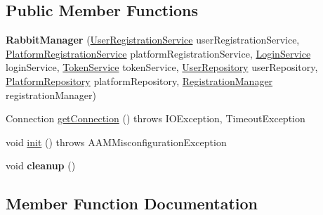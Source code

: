 \subsection*{Public Member Functions}
\begin{DoxyCompactItemize}
\item 
{\bfseries Rabbit\+Manager} (\hyperlink{classeu_1_1h2020_1_1symbiote_1_1security_1_1services_1_1UserRegistrationService}{User\+Registration\+Service} user\+Registration\+Service, \hyperlink{classeu_1_1h2020_1_1symbiote_1_1security_1_1services_1_1PlatformRegistrationService}{Platform\+Registration\+Service} platform\+Registration\+Service, \hyperlink{classeu_1_1h2020_1_1symbiote_1_1security_1_1services_1_1LoginService}{Login\+Service} login\+Service, \hyperlink{classeu_1_1h2020_1_1symbiote_1_1security_1_1services_1_1TokenService}{Token\+Service} token\+Service, \hyperlink{interfaceeu_1_1h2020_1_1symbiote_1_1security_1_1repositories_1_1UserRepository}{User\+Repository} user\+Repository, \hyperlink{interfaceeu_1_1h2020_1_1symbiote_1_1security_1_1repositories_1_1PlatformRepository}{Platform\+Repository} platform\+Repository, \hyperlink{classeu_1_1h2020_1_1symbiote_1_1security_1_1commons_1_1RegistrationManager}{Registration\+Manager} registration\+Manager)\hypertarget{classeu_1_1h2020_1_1symbiote_1_1security_1_1amqp_1_1RabbitManager_a20251a4a97883cabfcfbdde90bd293f3}{}\label{classeu_1_1h2020_1_1symbiote_1_1security_1_1amqp_1_1RabbitManager_a20251a4a97883cabfcfbdde90bd293f3}

\item 
Connection \hyperlink{classeu_1_1h2020_1_1symbiote_1_1security_1_1amqp_1_1RabbitManager_a135b27190102885449f08bb49f514a90}{get\+Connection} ()  throws I\+O\+Exception, Timeout\+Exception 
\item 
void \hyperlink{classeu_1_1h2020_1_1symbiote_1_1security_1_1amqp_1_1RabbitManager_a85df036a5614d190f3002b15af43e437}{init} ()  throws A\+A\+M\+Misconfiguration\+Exception 
\item 
void {\bfseries cleanup} ()\hypertarget{classeu_1_1h2020_1_1symbiote_1_1security_1_1amqp_1_1RabbitManager_ab248e0618bcf289a988c130459032b1e}{}\label{classeu_1_1h2020_1_1symbiote_1_1security_1_1amqp_1_1RabbitManager_ab248e0618bcf289a988c130459032b1e}

\end{DoxyCompactItemize}


\subsection{Member Function Documentation}
